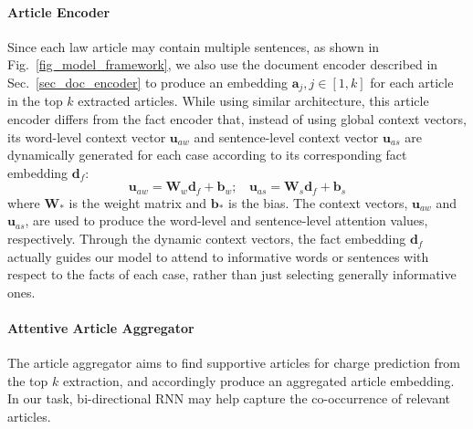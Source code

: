 \paragraph{Article Encoder}
\label{sec_article_encoder}
Since each law article may contain multiple sentences, 
as shown in Fig.~\ref{fig_model_framework}, we also use the document encoder described in Sec.~\ref{sec_doc_encoder} to produce an embedding $\mathbf{a}_j, j\in[1, k]$ for each article in the top $k$ extracted articles. 
While using similar architecture, this article encoder differs from the fact encoder that, instead of using global context vectors, its word-level context vector $\mathbf{u}_{aw}$ and sentence-level context vector $\mathbf{u}_{as}$ are dynamically generated  for each case according to its corresponding fact embedding $\mathbf{d}_f$:
\begin{equation}
\mathbf{u}_{aw} = \mathbf{W}_w \mathbf{d}_f + \mathbf{b}_w;\ \ \ \ \mathbf{u}_{as} = \mathbf{W}_s \mathbf{d}_f + \mathbf{b}_s
\label{eq_dynamic_context_vec}
\end{equation}
where $\mathbf{W_*}$ is the weight matrix and $\mathbf{b_*}$ is the bias. 
The context vectors, $\mathbf{u}_{aw}$ and $\mathbf{u}_{as}$, are used to produce the word-level and sentence-level attention values,  respectively.
Through the dynamic context vectors, the fact embedding $\mathbf{d}_f$ actually guides our model to attend to informative words or sentences with respect to the facts of each case, rather than just selecting generally informative ones.



\paragraph{Attentive Article Aggregator}
The article aggregator aims to find supportive articles for charge prediction from the top $k$ extraction, and accordingly produce an aggregated article embedding.
%
%
In our task, bi-directional RNN may help capture the co-occurrence of relevant articles.

